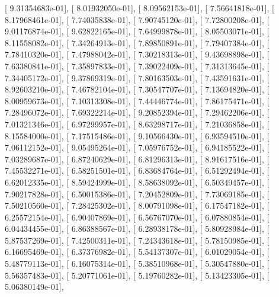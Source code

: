 \documentclass{article}
\begin{document}
       [  9.31354683e-01],
       [  8.01932050e-01],
       [  8.09562153e-01],
       [  7.56641818e-01],
       [  8.17968461e-01],
       [  7.74035838e-01],
       [  7.90745120e-01],
       [  7.72800208e-01],
       [  9.01176874e-01],
       [  9.62822165e-01],
       [  7.64999878e-01],
       [  8.05503071e-01],
       [  8.11558082e-01],
       [  7.34264913e-01],
       [  7.89850891e-01],
       [  7.79407384e-01],
       [  7.78410320e-01],
       [  7.47988042e-01],
       [  7.30218313e-01],
       [  9.43698898e-01],
       [  7.63380841e-01],
       [  7.35897833e-01],
       [  7.39022409e-01],
       [  7.31313645e-01],
       [  7.34405172e-01],
       [  9.37869319e-01],
       [  7.80163503e-01],
       [  7.43591631e-01],
       [  8.92603210e-01],
       [  7.46782104e-01],
       [  7.30547707e-01],
       [  7.13694820e-01],
       [  8.00959673e-01],
       [  7.10313308e-01],
       [  7.44446774e-01],
       [  7.86175471e-01],
       [  7.28496072e-01],
       [  7.69322214e-01],
       [  9.20852394e-01],
       [  7.29462206e-01],
       [  7.01321346e-01],
       [  6.97299957e-01],
       [  8.63298717e-01],
       [  7.21036858e-01],
       [  8.15584000e-01],
       [  7.17515486e-01],
       [  9.10566430e-01],
       [  6.93594510e-01],
       [  7.06112152e-01],
       [  9.05495264e-01],
       [  7.05976752e-01],
       [  6.94185522e-01],
       [  7.03289687e-01],
       [  6.87240629e-01],
       [  6.81296313e-01],
       [  8.91617516e-01],
       [  7.45532271e-01],
       [  6.58251501e-01],
       [  6.83684764e-01],
       [  6.51292494e-01],
       [  6.62012335e-01],
       [  8.59424999e-01],
       [  8.58638092e-01],
       [  6.50349457e-01],
       [  7.90217828e-01],
       [  6.50015386e-01],
       [  7.20452809e-01],
       [  7.73069185e-01],
       [  7.50210560e-01],
       [  7.28425302e-01],
       [  8.00791098e-01],
       [  6.17547182e-01],
       [  6.25572154e-01],
       [  6.90407869e-01],
       [  6.56767070e-01],
       [  6.07880854e-01],
       [  6.04434455e-01],
       [  6.86388567e-01],
       [  6.28938178e-01],
       [  5.80928984e-01],
       [  5.87537269e-01],
       [  7.42500311e-01],
       [  7.24343618e-01],
       [  5.78150985e-01],
       [  6.16695469e-01],
       [  6.37376982e-01],
       [  5.54137307e-01],
       [  6.01029054e-01],
       [  5.48779113e-01],
       [  6.16075314e-01],
       [  5.38510968e-01],
       [  5.30547880e-01],
       [  5.56357483e-01],
       [  5.20771061e-01],
       [  5.19760282e-01],
       [  5.13423305e-01],
       [  5.06380149e-01],
\end{document}
